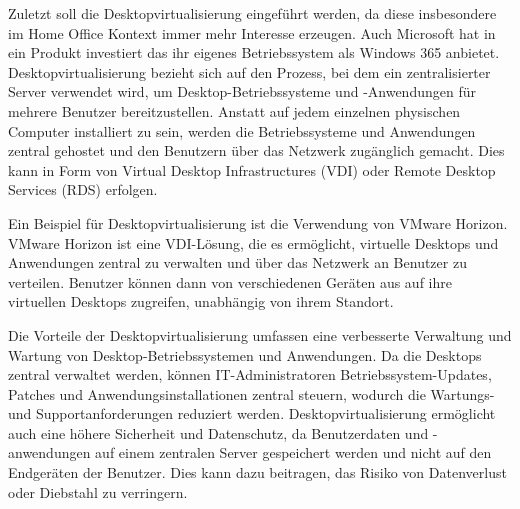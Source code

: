 Zuletzt soll die Desktopvirtualisierung eingeführt werden, da diese insbesondere im Home Office Kontext immer mehr Interesse erzeugen. Auch Microsoft hat in ein Produkt investiert das ihr eigenes Betriebssystem als Windows 365 anbietet. Desktopvirtualisierung bezieht sich auf den Prozess, bei dem ein zentralisierter Server verwendet wird, um Desktop-Betriebssysteme und -Anwendungen für mehrere Benutzer bereitzustellen. Anstatt auf jedem einzelnen physischen Computer installiert zu sein, werden die Betriebssysteme und Anwendungen zentral gehostet und den Benutzern über das Netzwerk zugänglich gemacht. Dies kann in Form von Virtual Desktop Infrastructures (VDI) oder Remote Desktop Services (RDS) erfolgen.

Ein Beispiel für Desktopvirtualisierung ist die Verwendung von VMware Horizon. VMware Horizon ist eine VDI-Lösung, die es ermöglicht, virtuelle Desktops und Anwendungen zentral zu verwalten und über das Netzwerk an Benutzer zu verteilen. Benutzer können dann von verschiedenen Geräten aus auf ihre virtuellen Desktops zugreifen, unabhängig von ihrem Standort.

Die Vorteile der Desktopvirtualisierung umfassen eine verbesserte Verwaltung und Wartung von Desktop-Betriebssystemen und Anwendungen. Da die Desktops zentral verwaltet werden, können IT-Administratoren Betriebssystem-Updates, Patches und Anwendungsinstallationen zentral steuern, wodurch die Wartungs- und Supportanforderungen reduziert werden. Desktopvirtualisierung ermöglicht auch eine höhere Sicherheit und Datenschutz, da Benutzerdaten und -anwendungen auf einem zentralen Server gespeichert werden und nicht auf den Endgeräten der Benutzer. Dies kann dazu beitragen, das Risiko von Datenverlust oder Diebstahl zu verringern.

